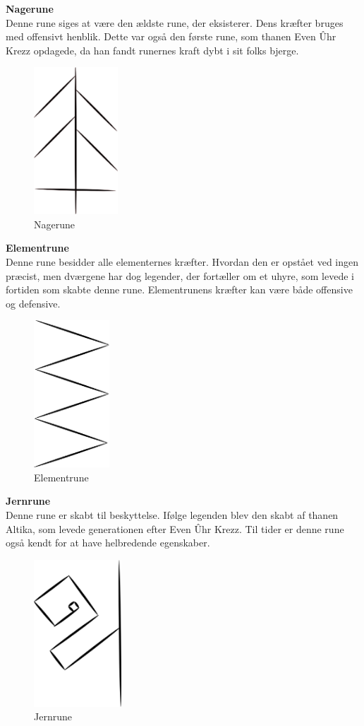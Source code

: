 \textbf{Nagerune}\\
Denne rune siges at være den ældste rune, der eksisterer. Dens kræfter bruges med offensivt henblik. Dette var også den første rune, som thanen Even Ûhr Krezz opdagede, da han fandt runernes kraft dybt i sit folks bjerge.\\
\begin{figure}[H]
    \centering
    \includegraphics[height=5.5cm]{setup/Pictures/Nagerune.png}
    \caption{Nagerune}
\end{figure}

\textbf{Elementrune}\\
Denne rune besidder alle elementernes kræfter. Hvordan den er opstået ved ingen præcist, men dværgene har dog legender, der fortæller om et uhyre, som levede i fortiden som skabte denne rune. Elementrunens kræfter kan være både offensive og defensive.\\
\begin{figure}[H]
    \centering
    \includegraphics[height=5.5cm]{setup/Pictures/Elementrune.png}
    \caption{Elementrune}
\end{figure}

\textbf{Jernrune}\\
Denne rune er skabt til beskyttelse. Ifølge legenden blev den skabt af thanen Altika, som levede generationen efter Even Ûhr Krezz. Til tider er denne rune også kendt for at have
helbredende egenskaber.
\begin{figure}[H]
    \centering
    \includegraphics[height=5.5cm]{setup/Pictures/Jernrune.png}
    \caption{Jernrune}
\end{figure}

